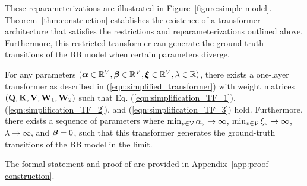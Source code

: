
These reparameterizations are illustrated in Figure~\ref{figure:simple-model}. Theorem~\ref{thm:construction} establishes the existence of a transformer architecture that satisfies the restrictions and reparameterizations outlined above. Furthermore, this restricted transformer can generate the ground-truth transitions of the BB model when certain parameters diverge. 
\begin{theorem}\label{thm:construction}
For any parameters $(\bm{\alpha} \in \mathbb{R}^{V}, \boldsymbol{\beta} \in \mathbb{R}^V, \bm{\xi} \in \mathbb{R}^V, \lambda \in \mathbb{R})$, there exists a one-layer transformer as described in (\ref{eqn:simplified_transformer}) with weight matrices $({\mathbf Q}, {\mathbf K}, {\mathbf V}, {\mathbf W}_1, {\mathbf W}_2)$ such that Eq. (\ref{eqn:simplification_TF_1}), (\ref{eqn:simplification_TF_2}), and (\ref{eqn:simplification_TF_3}) hold. Furthermore, there exists a sequence of parameters where $\min_{v \in \mathcal{V}} \alpha_v \to\infty$, $\min_{v \in \mathcal{V}} \xi_v \to\infty$, $\lambda\to \infty$, and $\boldsymbol{\beta}=0$, such that this transformer generates the ground-truth transitions of the BB model in the limit. %
\end{theorem}
The formal statement and proof of  are provided in Appendix~\ref{app:proof-construction}. 

